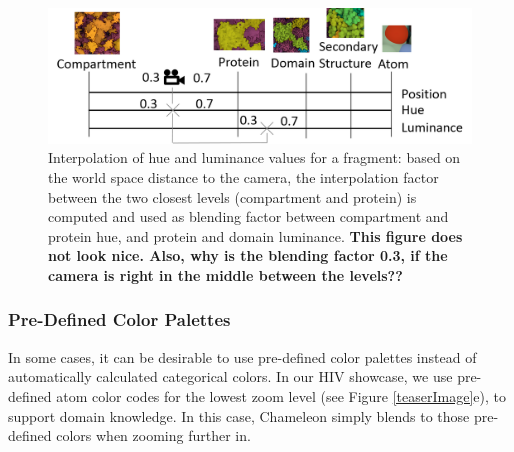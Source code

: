\documentclass{egpubl}
\begin{document}
		\begin{figure}
			\centering
			\includegraphics[width=1\linewidth]{Figures/zoomfigure}
			\caption{Interpolation of hue and luminance values for a fragment: based on the world space distance to the camera, the interpolation factor between the two closest levels (compartment and protein) is computed and used as blending factor between compartment and protein hue, and protein and domain luminance. \textbf{This figure does not look nice. Also, why is the blending factor 0.3, if the camera is right in the middle between the levels??}  }
			\label{fig:zoom_continuum}
		\end{figure}
	
	
	\subsubsection{Pre-Defined Color Palettes}
	
	In some cases, it can be desirable to use pre-defined color palettes instead of automatically calculated categorical colors. 
	In our HIV showcase, we use pre-defined atom color codes for the lowest zoom level (see Figure \ref{teaserImage}e), to support domain knowledge. 
	In this case, Chameleon simply blends to those pre-defined colors when zooming further in. 
	
\end{document}
